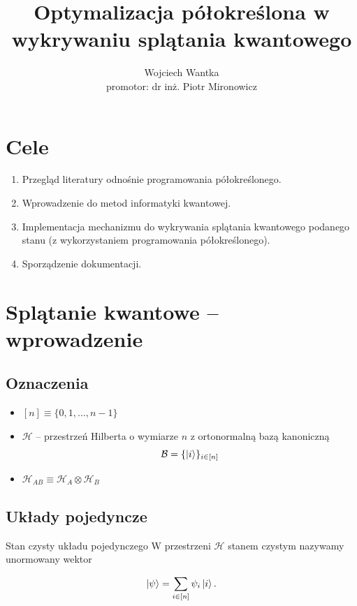 \documentclass{beamer}
\title{Optymalizacja półokreślona w wykrywaniu splątania kwantowego}
\author{Wojciech Wantka \\ promotor: dr inż. Piotr Mironowicz}
\date{}
\begin{document}
\frame{\titlepage}

\section{Cele}

\begin{frame}
    \begin{enumerate}
        \item Przegląd literatury odnośnie programowania półokreślonego.
        \item Wprowadzenie do metod informatyki kwantowej.
        \item Implementacja mechanizmu do wykrywania splątania kwantowego podanego stanu (z wykorzystaniem programowania półokreślonego).
        \item Sporządzenie dokumentacji.
    \end{enumerate}
\end{frame}

\section{Splątanie kwantowe -- wprowadzenie}

\subsection{Oznaczenia}

\begin{frame}
    \begin{itemize}
        \item $[n] \equiv \{0, 1, \ldots, n - 1\}$
        \item $\mathcal{H}$ -- przestrzeń Hilberta o wymiarze $n$ z ortonormalną bazą kanoniczną
            $$
                \mathcal{B} = \{\ket{i}\}_{i \in [n]}
            $$
        \item $\mathcal{H}_{AB} \equiv \mathcal{H}_{A} \otimes \mathcal{H}_{B}$
    \end{itemize}
\end{frame}

\subsection{Układy pojedyncze}

\begin{frame}
    \begin{exampleblock}{Stan czysty układu pojedynczego}
        W przestrzeni $\mathcal{H}$ stanem czystym nazywamy unormowany wektor

        $$
            \ket{\psi} = \sum \limits_{i \in [n]} \psi_{i} \ket{i}.
        $$
    \end{exampleblock}
\end{frame}
\end{document}
